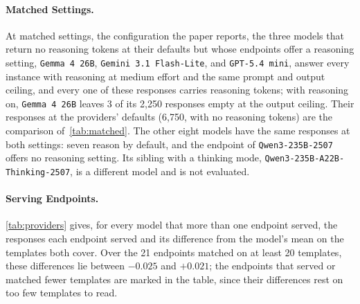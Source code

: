 \paragraph{Matched Settings.} At matched settings, the configuration the paper reports, the three
models that return no reasoning tokens at their defaults but whose endpoints offer a reasoning
setting, \texttt{Gemma 4 26B}, \texttt{Gemini 3.1 Flash-Lite}, and \texttt{GPT-5.4 mini}, answer
every instance with reasoning at
medium effort and the same prompt and output ceiling, and every one of these responses carries
reasoning tokens; with reasoning on, \texttt{Gemma 4 26B} leaves 3 of its 2,250 responses empty at
the output ceiling.
Their responses at the providers' defaults (6,750, with no reasoning tokens) are the comparison
of~\autoref{tab:matched}.
The other eight models have the same responses at both settings: seven reason by default, and the
endpoint of \texttt{Qwen3-235B-2507} offers no reasoning setting.
Its sibling with a thinking mode, \texttt{Qwen3-235B-A22B-Thinking-2507}, is a different model and
is not evaluated.

\paragraph{Serving Endpoints.} \autoref{tab:providers} gives, for every model that more than one
endpoint served, the responses each endpoint served and its difference from the model's mean on the
templates both cover.
Over the 21 endpoints matched on at least 20 templates, these differences lie between $-0.025$ and
$+0.021$; the endpoints that served or matched fewer templates are marked in the table, since their
differences rest on too few templates to read.

